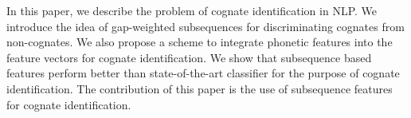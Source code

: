 In this paper, we describe the problem of cognate identification in NLP. We introduce the idea of gap-weighted subsequences for discriminating cognates from non-cognates. We also propose a scheme to integrate phonetic features into the feature vectors for cognate identification. We show that subsequence based features perform better than state-of-the-art classifier for the purpose of cognate identification. The contribution of this paper is the use of subsequence features for cognate identification.
